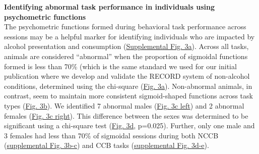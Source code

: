 \documentclass{article}
\begin{document}
\noindent\textbf{Identifying abnormal task performance in individuals using psychometric functions}\\
The psychometric functions formed during behavioral task performance across sessions may be a helpful marker for identifying individuals who are impacted by alcohol presentation and consumption (\hyperref[fig:Alcohol_SI_3]{Supplemental Fig. 3a}). Across all tasks, animals are considered “abnormal” when the proportion of sigmoidal functions formed is less than 70\% (which is the same standard we used for our initial publication where we develop and validate the RECORD system\cite{ibanez2024record} of non-alcohol conditions, determined using the chi-square (\hyperref[fig:alcohol_main_3]{Fig. 3a}). Non-abnormal animals, in contrast, seem to maintain more consistent sigmoid-shaped functions across task types (\hyperref[fig:alcohol_main_3]{Fig. 3b}). We identified 7 abnormal males (\hyperref[fig:alcohol_main_3]{Fig. 3c left}) and 2 abnormal females (\hyperref[fig:alcohol_main_3]{Fig. 3c right}). This difference between the sexes was determined to be significant using a chi-square test (\hyperref[fig:alcohol_main_3]{Fig. 3d}, p=0.025). Further, only one male and 3 females had less than 70\% of sigmoidal sessions during both NCCB (\hyperref[fig:Alcohol_SI_3]{supplemental Fig. 3b-c}) and CCB tasks (\hyperref[fig:Alcohol_SI_3]{supplemental Fig. 3d-e}).
\end{document}
